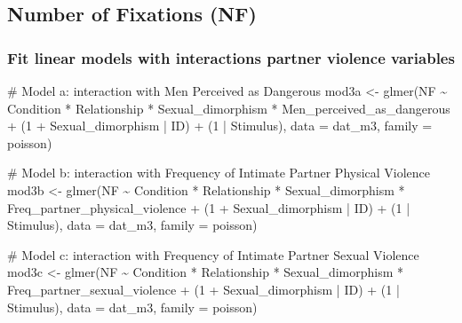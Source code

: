 \documentclass[
  bookmarksnumbered]{article}
\newenvironment{Shaded}{\begin{snugshade}}{\end{snugshade}}
\newcommand{\AttributeTok}[1]{\textcolor[rgb]{0.80,0.80,0.80}{#1}}
\newcommand{\CommentTok}[1]{\textcolor[rgb]{0.50,0.62,0.50}{#1}}
\newcommand{\DecValTok}[1]{\textcolor[rgb]{0.86,0.86,0.80}{#1}}
\newcommand{\FunctionTok}[1]{\textcolor[rgb]{0.94,0.94,0.56}{#1}}
\newcommand{\NormalTok}[1]{\textcolor[rgb]{0.80,0.80,0.80}{#1}}
\newcommand{\OtherTok}[1]{\textcolor[rgb]{0.94,0.94,0.56}{#1}}
\newcommand{\SpecialCharTok}[1]{\textcolor[rgb]{0.86,0.64,0.64}{#1}}
\begin{document}
\subsection{Number of Fixations (NF)}\label{number-of-fixations-nf-1}

\subsubsection{Fit linear models with interactions partner violence variables}\label{fit-linear-models-with-interactions-partner-violence-variables-2}

\begin{Shaded}
\begin{Highlighting}[]
\CommentTok{\# Model a: interaction with Men Perceived as Dangerous}
\NormalTok{mod3a }\OtherTok{\textless{}{-}} \FunctionTok{glmer}\NormalTok{(NF }\SpecialCharTok{\textasciitilde{}}
\NormalTok{                Condition }\SpecialCharTok{*}\NormalTok{ Relationship }\SpecialCharTok{*}\NormalTok{ Sexual\_dimorphism }\SpecialCharTok{*}\NormalTok{ Men\_perceived\_as\_dangerous }\SpecialCharTok{+}
\NormalTok{                (}\DecValTok{1} \SpecialCharTok{+}\NormalTok{ Sexual\_dimorphism }\SpecialCharTok{|}\NormalTok{ ID) }\SpecialCharTok{+}\NormalTok{ (}\DecValTok{1} \SpecialCharTok{|}\NormalTok{ Stimulus), }
              \AttributeTok{data =}\NormalTok{ dat\_m3,}
              \AttributeTok{family =}\NormalTok{ poisson)}

\CommentTok{\# Model b: interaction with Frequency of Intimate Partner Physical Violence}
\NormalTok{mod3b }\OtherTok{\textless{}{-}} \FunctionTok{glmer}\NormalTok{(NF }\SpecialCharTok{\textasciitilde{}}
\NormalTok{                Condition }\SpecialCharTok{*}\NormalTok{ Relationship }\SpecialCharTok{*}\NormalTok{ Sexual\_dimorphism }\SpecialCharTok{*}\NormalTok{ Freq\_partner\_physical\_violence }\SpecialCharTok{+}
\NormalTok{                (}\DecValTok{1} \SpecialCharTok{+}\NormalTok{ Sexual\_dimorphism }\SpecialCharTok{|}\NormalTok{ ID) }\SpecialCharTok{+}\NormalTok{ (}\DecValTok{1} \SpecialCharTok{|}\NormalTok{ Stimulus), }
              \AttributeTok{data =}\NormalTok{ dat\_m3,}
              \AttributeTok{family =}\NormalTok{ poisson)}

\CommentTok{\# Model c: interaction with Frequency of Intimate Partner Sexual Violence}
\NormalTok{mod3c }\OtherTok{\textless{}{-}} \FunctionTok{glmer}\NormalTok{(NF }\SpecialCharTok{\textasciitilde{}}
\NormalTok{                Condition }\SpecialCharTok{*}\NormalTok{ Relationship }\SpecialCharTok{*}\NormalTok{ Sexual\_dimorphism }\SpecialCharTok{*}\NormalTok{ Freq\_partner\_sexual\_violence }\SpecialCharTok{+}
\NormalTok{                (}\DecValTok{1} \SpecialCharTok{+}\NormalTok{ Sexual\_dimorphism }\SpecialCharTok{|}\NormalTok{ ID) }\SpecialCharTok{+}\NormalTok{ (}\DecValTok{1} \SpecialCharTok{|}\NormalTok{ Stimulus), }
              \AttributeTok{data =}\NormalTok{ dat\_m3,}
              \AttributeTok{family =}\NormalTok{ poisson)}


\end{Highlighting}
\end{Shaded}
\end{document}
